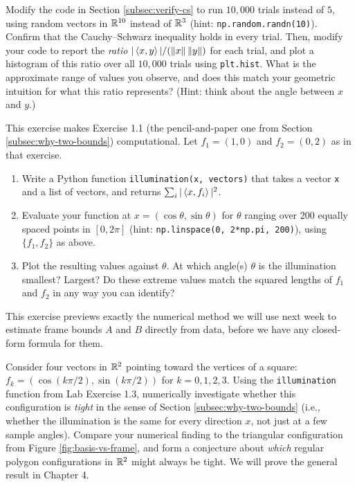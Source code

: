\begin{exercisebox}[title={Lab Exercise 1.2: Cauchy--Schwarz at Scale}]
Modify the code in Section \ref{subsec:verify-cs} to run $10{,}000$ trials instead of $5$, using random vectors in $\mathbb{R}^{10}$ instead of $\mathbb{R}^3$ (hint: \texttt{np.random.randn(10)}). Confirm that the Cauchy--Schwarz inequality holds in every trial. Then, modify your code to report the \emph{ratio} $|\left\langle x, y \right\rangle| / (\left\| x \right\|\left\| y \right\|)$ for each trial, and plot a histogram of this ratio over all $10{,}000$ trials using \texttt{plt.hist}. What is the approximate range of values you observe, and does this match your geometric intuition for what this ratio represents? (Hint: think about the angle between $x$ and $y$.)
\end{exercisebox}

\begin{exercisebox}[title={Lab Exercise 1.3: The Asymmetry of Redundant Sets}]
This exercise makes Exercise 1.1 (the pencil-and-paper one from Section \ref{subsec:why-two-bounds}) computational. Let $f_1 = (1,0)$ and $f_2 = (0,2)$ as in that exercise.
\begin{enumerate}[label=(\alph*)]
  \item Write a Python function \texttt{illumination(x, vectors)} that takes a vector \texttt{x} and a list of vectors, and returns $\sum_i |\left\langle x, f_i \right\rangle|^2$.
  \item Evaluate your function at $x = (\cos\theta, \sin\theta)$ for $\theta$ ranging over $200$ equally spaced points in $[0, 2\pi]$ (hint: \texttt{np.linspace(0, 2*np.pi, 200)}), using $\{f_1, f_2\}$ as above.
  \item Plot the resulting values against $\theta$. At which angle(s) $\theta$ is the illumination smallest? Largest? Do these extreme values match the squared lengths of $f_1$ and $f_2$ in any way you can identify?
\end{enumerate}
This exercise previews exactly the numerical method we will use next week to estimate frame bounds $A$ and $B$ directly from data, before we have any closed-form formula for them.
\end{exercisebox}

\begin{exercisebox}[title={Lab Exercise 1.4 (Optional, Challenge): A Square Configuration}]
Consider four vectors in $\mathbb{R}^2$ pointing toward the vertices of a square: $f_k = (\cos(k\pi/2), \sin(k\pi/2))$ for $k = 0, 1, 2, 3$. Using the \texttt{illumination} function from Lab Exercise 1.3, numerically investigate whether this configuration is \emph{tight} in the sense of Section \ref{subsec:why-two-bounds} (i.e., whether the illumination is the same for every direction $x$, not just at a few sample angles). Compare your numerical finding to the triangular configuration from Figure \ref{fig:basis-vs-frame}, and form a conjecture about \emph{which} regular polygon configurations in $\mathbb{R}^2$ might always be tight. We will prove the general result in Chapter 4.
\end{exercisebox}
\newpage
